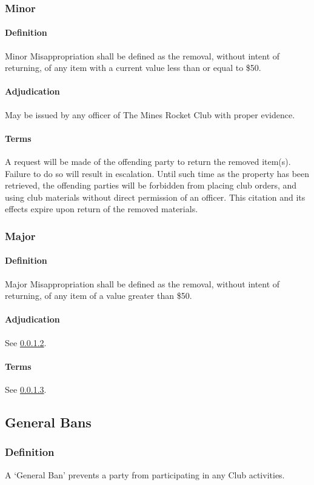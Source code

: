 \documentclass[12pt]{article}
\begin{document}
\subsubsection{Minor}
\paragraph{Definition}
Minor Misappropriation shall be defined as the removal, without intent of returning, 
of any item with a current value less than or equal to \$50.
\paragraph{Adjudication}
\label{misap:adj}
May be issued by any officer of The Mines Rocket Club with proper evidence.
\paragraph{Terms}
\label{misap:terms}
A request will be made of the offending party to return the removed item(s).
Failure to do so will result in escalation.
Until such time as the property has been retrieved,
the offending parties will be forbidden from placing club orders, 
and using club materials without direct permission of an officer.
This citation and its effects expire upon return of the removed materials.
\subsubsection{Major}
\paragraph{Definition}
Major Misappropriation shall be defined as the removal, without intent of returning,
of any item of a value greater than \$50.
\paragraph{Adjudication}
See \cref{misap:adj}.
\paragraph{Terms}
See \cref{misap:terms}.
\subsection{General Bans}
\label{citations:ban}
\subsubsection{Definition}
A `General Ban' prevents a party from participating in any Club activities.
\end{document}
